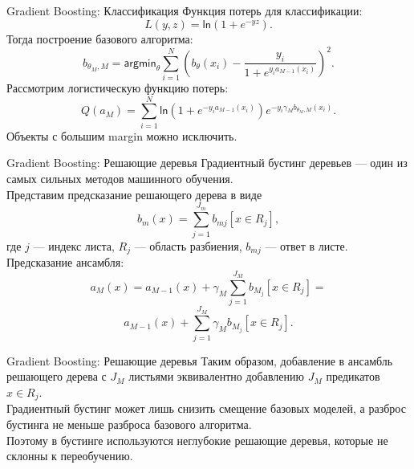 \documentclass[handout]{beamer}
\begin{document}
\begin{frame}{Gradient Boosting: Классификация}	
	Функция потерь для классификации:
	\begin{equation*}
		L(y, z)=\mathsf{ln}(1+e^{-yz}).
	\end{equation*}
	Тогда построение базового алгоритма:
	\begin{equation*}
		b_{\theta_M, M}=\mathsf{argmin}_{\theta}\sum_{i=1}^N\left( b_{\theta}(x_i) - \frac{y_i}{1+e^{y_ia_{M-1}(x_i)}}\right)^2.
	\end{equation*}
	Рассмотрим логистическую функцию потерь: 
	\begin{equation*}
	Q(a_M)=\sum_{i=1}^N\mathsf{ln}(1+e^{-y_ia_{M-1}(x_i)})e^{-y_i\gamma_Mb_{\theta_M, M}(x_i)}.
	\end{equation*}
Объекты с большим margin можно исключить.
\end{frame}

\begin{frame}{Gradient Boosting: Решающие деревья}
	Градиентный бустинг деревьев --- один из самых сильных методов машинного обучения.\\
	Представим предсказание решающего дерева в виде
	\begin{equation*}
		b_m(x)=\sum_{j=1}^{J_m}b_{mj}[x\in R_j],
	\end{equation*}
	где $j$ --- индекс листа, $R_j$ --- область разбиения, $b_{mj}$ --- ответ в листе.\\
	Предсказание ансамбля:
	\begin{equation*}
		a_M(x)=a_{M-1}(x)+\gamma_M\sum_{j=1}^{J_M}b_{M_j}[x\in R_j]=
	\end{equation*}
	\begin{equation*}
a_{M-1}(x)+\sum_{j=1}^{J_M}\gamma_Mb_{M_j}[x\in R_j].
	\end{equation*}

\end{frame}	

\begin{frame}{Gradient Boosting: Решающие деревья}
	Таким образом, добавление в ансамбль решающего дерева с $J_M$ листьями эквивалентно добавлению $J_M$ предикатов $x\in R_j$.\\
	Градиентный бустинг может лишь снизить смещение базовых моделей, а разброс бустинга не меньше разброса базового алгоритма.\\
	Поэтому в бустинге используются неглубокие решающие деревья, которые не склонны к переобучению.
\end{frame}
\end{document}
